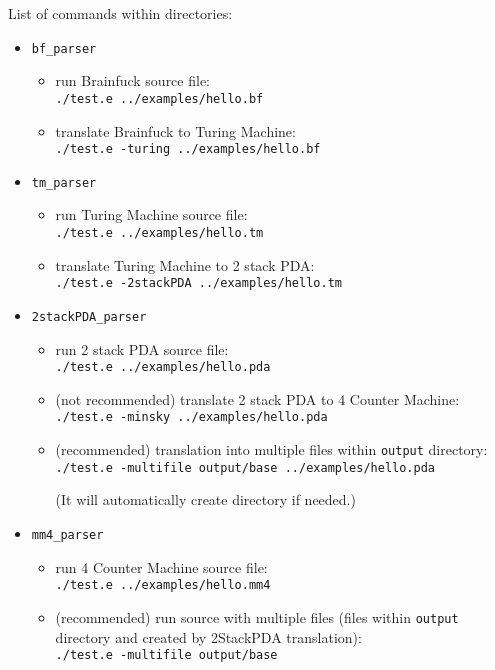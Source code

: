 \documentclass[english,shortabstract,mgr]{iithesis}
\begin{document}
List of commands within directories:
\begin{itemize}
  \item \texttt{bf\_parser}
    \begin{itemize}
      \item run Brainfuck source file: \\ \texttt{./test.e ../examples/hello.bf}
      \item translate Brainfuck to Turing Machine: \\ \texttt{./test.e -turing ../examples/hello.bf}
    \end{itemize}
  \item \texttt{tm\_parser}
    \begin{itemize}
      \item run Turing Machine source file: \\ \texttt{./test.e ../examples/hello.tm}
      \item translate Turing Machine to 2 stack PDA: \\ \texttt{./test.e -2stackPDA ../examples/hello.tm}
    \end{itemize}
  \item \texttt{2stackPDA\_parser}
    \begin{itemize}
      \item run 2 stack PDA source file: \\ \texttt{./test.e ../examples/hello.pda}
      \item (not recommended) translate 2 stack PDA to 4 Counter Machine: \\ \texttt{./test.e -minsky ../examples/hello.pda}
      \item (recommended) translation into multiple files within \texttt{output}
        directory: \\ \texttt{./test.e -multifile output/base ../examples/hello.pda}

        (It will automatically create directory if needed.)
    \end{itemize}
  \item \texttt{mm4\_parser}
    \begin{itemize}
      \item run 4 Counter Machine source file: \\ \texttt{./test.e ../examples/hello.mm4}
      \item (recommended) run source with multiple files (files within \texttt{output}
        directory and created by 2StackPDA translation): \\ \texttt{./test.e -multifile output/base}
    \end{itemize}
\end{itemize}
\end{document}
